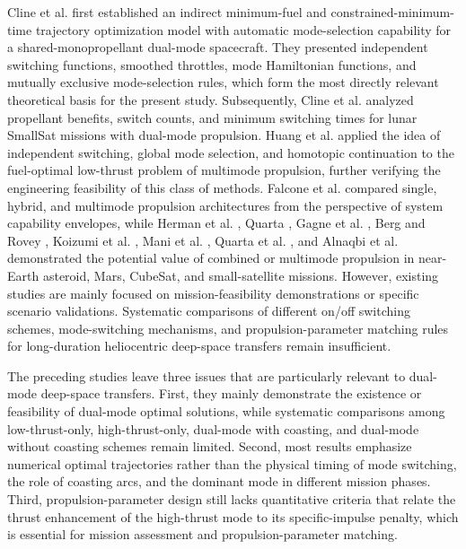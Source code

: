 ﻿\documentclass{IEEEtaes}
\begin{document}
Cline et al. \cite{cline2024a} first established an indirect minimum-fuel and constrained-minimum-time trajectory optimization model with automatic mode-selection capability for a shared-monopropellant dual-mode spacecraft. They presented independent switching functions, smoothed throttles, mode Hamiltonian functions, and mutually exclusive mode-selection rules, which form the most directly relevant theoretical basis for the present study. Subsequently, Cline et al. \cite{cline2024b} analyzed propellant benefits, switch counts, and minimum switching times for lunar SmallSat missions with dual-mode propulsion. Huang et al. \cite{huang2026} applied the idea of independent switching, global mode selection, and homotopic continuation to the fuel-optimal low-thrust problem of multimode propulsion, further verifying the engineering feasibility of this class of methods. Falcone et al. \cite{falcone2025} compared single, hybrid, and multimode propulsion architectures from the perspective of system capability envelopes, while Herman et al. \cite{herman2014}, Quarta \cite{quarta2024}, Gagne et al. \cite{gagne2018}, Berg and Rovey \cite{berg2017}, Koizumi et al. \cite{koizumi2016}, Mani et al. \cite{mani2019}, Quarta et al. \cite{quarta2025}, and Alnaqbi et al. \cite{alnaqbi2024} demonstrated the potential value of combined or multimode propulsion in near-Earth asteroid, Mars, CubeSat, and small-satellite missions. However, existing studies are mainly focused on mission-feasibility demonstrations or specific scenario validations. Systematic comparisons of different on/off switching schemes, mode-switching mechanisms, and propulsion-parameter matching rules for long-duration heliocentric deep-space transfers remain insufficient.

The preceding studies leave three issues that are particularly relevant to dual-mode deep-space transfers. First, they mainly demonstrate the existence or feasibility of dual-mode optimal solutions, while systematic comparisons among low-thrust-only, high-thrust-only, dual-mode with coasting, and dual-mode without coasting schemes remain limited. Second, most results emphasize numerical optimal trajectories rather than the physical timing of mode switching, the role of coasting arcs, and the dominant mode in different mission phases. Third, propulsion-parameter design still lacks quantitative criteria that relate the thrust enhancement of the high-thrust mode to its specific-impulse penalty, which is essential for mission assessment and propulsion-parameter matching.
\end{document}
